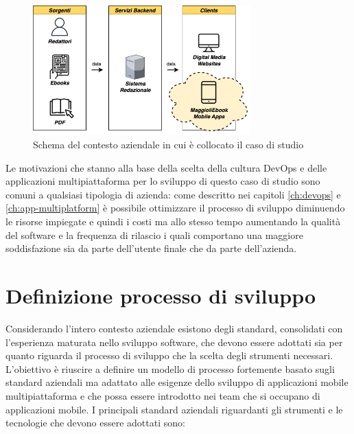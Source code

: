 \begin{figure}[H]
    \centering
    \includegraphics[width=0.75\textwidth]{img/contesto-aziendale.png}
    \caption{Schema del contesto aziendale in cui è collocato il caso di studio}
    \label{contesto-aziendale-fig}
\end{figure}

Le motivazioni che stanno alla base della scelta della cultura DevOps e delle applicazioni multipiattaforma per lo sviluppo di questo caso di studio sono comuni a qualsiasi tipologia di azienda: come descritto nei capitoli \ref{ch:devops} e \ref{ch:app-multiplatform} è possibile ottimizzare il processo di sviluppo diminuendo le risorse impiegate e quindi i costi ma allo stesso tempo aumentando la qualità del software e la frequenza di rilascio i quali comportano una maggiore soddisfazione sia da parte dell'utente finale che da parte dell'azienda.

\section{Definizione processo di sviluppo}
Considerando l'intero contesto aziendale esistono degli standard, consolidati con l'esperienza maturata nello sviluppo software, che devono essere adottati sia per quanto riguarda il processo di sviluppo che la scelta degli strumenti necessari. L'obiettivo è riuscire a definire un modello di processo fortemente basato sugli standard aziendali ma adattato alle esigenze dello sviluppo di applicazioni mobile multipiattaforma e che possa essere introdotto nei team che si occupano di applicazioni mobile. I principali standard aziendali riguardanti gli strumenti e le tecnologie che devono essere adottati sono:

